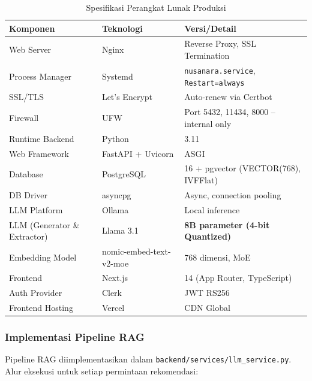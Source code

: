 \begin{table}[H]
\centering
\caption{Spesifikasi Perangkat Lunak Produksi}
\label{tab:spesifikasi_sw}
\begin{tabularx}{\textwidth}{llX}
\toprule
\textbf{Komponen} & \textbf{Teknologi} & \textbf{Versi/Detail} \\
\midrule
Web Server & Nginx & Reverse Proxy, SSL Termination \\
Process Manager & Systemd & \texttt{nusanara.service}, \texttt{Restart=always} \\
SSL/TLS & Let's Encrypt & Auto-renew via Certbot \\
Firewall & UFW & Port 5432, 11434, 8000 -- internal only \\
\midrule
Runtime Backend & Python & 3.11 \\
Web Framework & FastAPI + Uvicorn & ASGI \\
Database & PostgreSQL & 16 + pgvector (VECTOR(768), IVFFlat) \\
DB Driver & asyncpg & Async, connection pooling \\
LLM Platform & Ollama & Local inference \\
LLM (Generator \& Extractor) & Llama 3.1 & \textbf{8B parameter (4-bit Quantized)} \\
Embedding Model & nomic-embed-text-v2-moe & 768 dimensi, MoE \\
\midrule
Frontend & Next.js & 14 (App Router, TypeScript) \\
Auth Provider & Clerk & JWT RS256 \\
Frontend Hosting & Vercel & CDN Global \\
\bottomrule
\end{tabularx}
\end{table}

\subsubsection{Implementasi Pipeline RAG}

Pipeline RAG diimplementasikan dalam \texttt{backend/services/llm\_service.py}.
Alur eksekusi untuk setiap permintaan rekomendasi:

